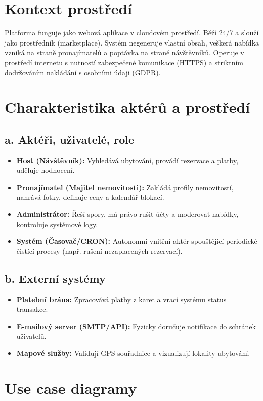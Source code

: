 \documentclass[11pt, a4paper]{article}
\begin{document}
\section{Kontext prostředí}
Platforma funguje jako webová aplikace v cloudovém prostředí. Běží 24/7 a slouží jako prostředník (marketplace). Systém negeneruje vlastní obsah, veškerá nabídka vzniká na straně pronajímatelů a poptávka na straně návštěvníků. Operuje v prostředí internetu s nutností zabezpečené komunikace (HTTPS) a striktním dodržováním nakládání s osobními údaji (GDPR).

\section{Charakteristika aktérů a prostředí}

\subsection*{a. Aktéři, uživatelé, role}
\begin{itemize}
    \item \textbf{Host (Návštěvník):} Vyhledává ubytování, provádí rezervace a platby, uděluje hodnocení.
    \item \textbf{Pronajímatel (Majitel nemovitosti):} Zakládá profily nemovitostí, nahrává fotky, definuje ceny a kalendář blokací.
    \item \textbf{Administrátor:} Řeší spory, má právo rušit účty a moderovat nabídky, kontroluje systémové logy.
    \item \textbf{Systém (Časovač/CRON):} Autonomní vnitřní aktér spouštějící periodické čistící procesy (např. rušení nezaplacených rezervací).
\end{itemize}

\subsection*{b. Externí systémy}
\begin{itemize}
    \item \textbf{Platební brána:} Zpracovává platby z karet a vrací systému status transakce.
    \item \textbf{E-mailový server (SMTP/API):} Fyzicky doručuje notifikace do schránek uživatelů.
    \item \textbf{Mapové služby:} Validují GPS souřadnice a vizualizují lokality ubytování.
\end{itemize}

\section{Use case diagramy}
\end{document}

